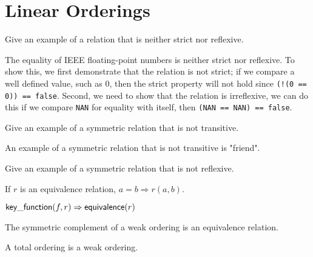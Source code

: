 \chapter{Linear Orderings}

\begin{exercise}
	Give an example of a relation that is neither strict nor reflexive.
\end{exercise}

\begin{solution}
	The equality of IEEE floating-point numbers is neither strict nor reflexive. To show this, we first
	demonstrate that the relation is not strict; if we compare a well defined value, such as 0, then
	the strict property will not hold since \verb|(!(0 == 0)) == false|. Second, we need to show that
	the relation is irreflexive, we can do this if we compare \verb|NAN| for equality with itself, then
	\verb|(NAN == NAN) == false|.

	
\end{solution}

\begin{exercise}
	Give an example of a symmetric relation that is not transitive.
\end{exercise}

\begin{solution}
	An example of a symmetric relation that is not transitive is "friend".
\end{solution}

\begin{exercise}
	Give an example of a symmetric relation that is not reflexive.
\end{exercise}

\begin{lemma}
	If $r$ is an equivalence relation, $a = b \Rightarrow r(a, b)$.
\end{lemma}

\begin{lemma}
	$\mathsf{key\_function}(f, r) \Rightarrow \mathsf{equivalence}(r)$
\end{lemma}

\begin{lemma}
	The symmetric complement of a weak ordering is an equivalence relation.
\end{lemma}

\begin{lemma}
	A total ordering is a weak ordering.
\end{lemma}

